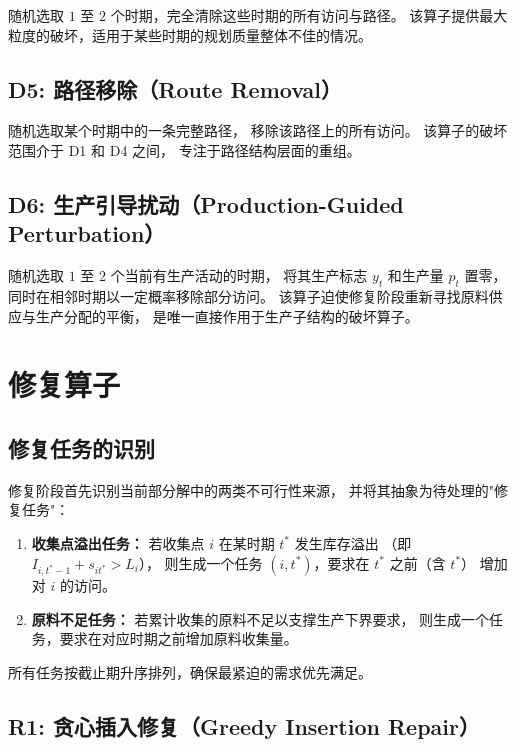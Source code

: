 \documentclass{article}
\begin{document}
随机选取 $1$ 至 $2$ 个时期，完全清除这些时期的所有访问与路径。
该算子提供最大粒度的破坏，适用于某些时期的规划质量整体不佳的情况。

\subsection{D5: 路径移除（Route Removal）}

随机选取某个时期中的一条完整路径，
移除该路径上的所有访问。
该算子的破坏范围介于 D1 和 D4 之间，
专注于路径结构层面的重组。

\subsection{D6: 生产引导扰动（Production-Guided Perturbation）}

随机选取 $1$ 至 $2$ 个当前有生产活动的时期，
将其生产标志 $y_t$ 和生产量 $p_t$ 置零，
同时在相邻时期以一定概率移除部分访问。
该算子迫使修复阶段重新寻找原料供应与生产分配的平衡，
是唯一直接作用于生产子结构的破坏算子。

\section{修复算子}
\label{sec:alns-repair}

\subsection{修复任务的识别}

修复阶段首先识别当前部分解中的两类不可行性来源，
并将其抽象为待处理的"修复任务"：

\begin{enumerate}
  \item \textbf{收集点溢出任务：}
    若收集点 $i$ 在某时期 $t^*$ 发生库存溢出
    （即 $I_{i,t^*-1} + s_{it^*} > L_i$），
    则生成一个任务 $(i, t^*)$，要求在 $t^*$ 之前（含 $t^*$）
    增加对 $i$ 的访问。
  \item \textbf{原料不足任务：}
    若累计收集的原料不足以支撑生产下界要求，
    则生成一个任务，要求在对应时期之前增加原料收集量。
\end{enumerate}

所有任务按截止期升序排列，确保最紧迫的需求优先满足。

\subsection{R1: 贪心插入修复（Greedy Insertion Repair）}
\end{document}
